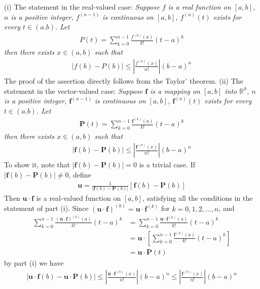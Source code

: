 \documentclass[12pt]{article}
\theoremstyle{definition}
\begin{document}
(i) The statement in the real-valued case: \textit{Suppose $f$ is a real function on $[a,b]$, $n$ is a positive integer, $f^{(n-1)}$ is continuous on $[a,b]$, $f^{(n)}(t)$ exists for every $t\in(a.b)$. Let
\begin{align*}
P(t)=\sum_{k=0}^{n-1}\frac{f^{(k)}(a)}{k!}(t-a)^k
\end{align*}
then there exists $x\in(a,b)$ such that}
\begin{align*}
\left\vert f(b)-P(b)\right\vert\le\left\vert\frac{f^{(n)}(x)}{n!}\right\vert(b-a)^n
\end{align*}
The proof of the assertion directly follows from the Taylor' theorem.
(ii) The statement in the vector-valued case: \textit{Suppose $\mathbf{f}$ is a mapping on $[a,b]$ into $\mathbb{R}^k$, $n$ is a positive integer, $\mathbf{f}^{(n-1)}$ is continuous on $[a,b]$, $\mathbf{f}^{(n)}(t)$ exists for every $t\in(a.b)$. Let
\begin{align*}
\mathbf{P}(t)=\sum_{k=0}^{n-1}\frac{\mathbf{f}^{(k)}(a)}{k!}(t-a)^k
\end{align*}
then there exists $x\in(a,b)$ such that}
\begin{align*}
\left\vert \mathbf{f}(b)-\mathbf{P}(b)\right\vert\le\left\vert\frac{\mathbf{f}^{(n)}(x)}{n!}\right\vert(b-a)^n
\end{align*}
To show it, note that $\left\vert \mathbf{f}(b)-\mathbf{P}(b)\right\vert=0$ is a trivial case. If $\left\vert \mathbf{f}(b)-\mathbf{P}(b)\right\vert\ne 0$, define 
\begin{align*}
\mathbf{u}=\frac{1}{\left\vert \mathbf{f}(b)-\mathbf{P}(b)\right\vert}\left[\mathbf{f}(b)-\mathbf{P}(b)\right]
\end{align*}
Then $\mathbf{u}\cdot\mathbf{f}$ is a real-valued function on $[a,b]$, satisfying all the conditions in the statement of part (i). Since $(\mathbf{u}\cdot\mathbf{f})^{(k)}=\mathbf{u}\cdot\mathbf{f}^{(k)}$ for $k=0,1,2,\ldots,n$, and
\begin{align*}
\sum_{k=0}^{n-1}\frac{(\mathbf{u}\cdot\mathbf{f})^{(k)}(a)}{k!}(t-a)^k
&=\sum_{k=0}^{n-1}\frac{\mathbf{u}\cdot\mathbf{f}^{(k)}(a)}{k!}(t-a)^k \\
&=\mathbf{u}\cdot\left[\sum_{k=0}^{n-1}\frac{\mathbf{f}^{(k)}(a)}{k!}(t-a)^k\right] \\
&=\mathbf{u}\cdot\mathbf{P}(t)
\end{align*}
by part (i) we have
\begin{align*}
\left\vert \mathbf{u}\cdot\mathbf{f}(b)-\mathbf{u}\cdot\mathbf{P}(b)\right\vert
\le\left\vert\frac{\mathbf{u}\cdot\mathbf{f}^{(n)}(x)}{n!}\right\vert(b-a)^n
\le\left\vert\frac{\mathbf{f}^{(n)}(x)}{n!}\right\vert(b-a)^n
\end{align*}
\end{document}
